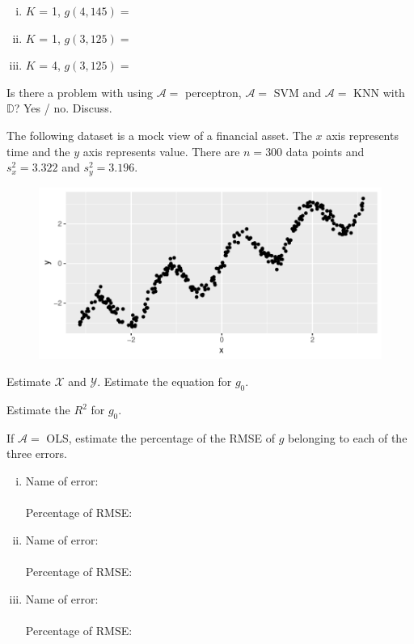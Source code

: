 \documentclass[12pt]{article}
\begin{document}
\begin{enumerate}[i)]
\item $K$ = 1, $g(4,145) = $
\item $K$ = 1, $g(3,125) = $ 
\item $K$ = 4, $g(3,125) = $ 
\end{enumerate}

 Is there a problem with using  $\mathcal{A} = $ perceptron, $\mathcal{A} = $ SVM and $\mathcal{A} = $ KNN with $\mathbb{D}$? Yes / no. Discuss.
\eenum

\problem The following dataset is a mock view of a financial asset. The $x$ axis represents time and the $y$ axis represents value. There are $n = 300$ data points and $s^2_x = 3.322$ and $s^2_y = 3.196$.

\begin{figure}[htp]
\centering
\includegraphics[width=5in]{curvyline}
\end{figure}


\benum

 Estimate $\mathcal{X}$ and $\mathcal{Y}$.
 Estimate the equation for $g_0$.

 Estimate the $R^2$ for $g_0$.


 If $\mathcal{A} = $ OLS, estimate the percentage of the RMSE of $g$ belonging to each of the three errors. 

\begin{enumerate}[i)]
\item Name of error:\\
~\\
Percentage of RMSE:\\
\item Name of error:\\
~\\
Percentage of RMSE:\\
\item Name of error:\\
~\\
Percentage of RMSE:\\
\end{enumerate}
\end{document}
